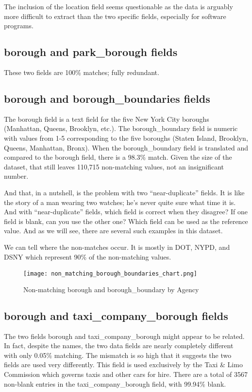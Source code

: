 \documentclass[12pt, titlepage]{article}
\begin{document}
The inclusion of the location field seems questionable as the data is arguably more difficult to extract than the two specific fields, especially for
software programs.

\subsection{borough and park\_borough fields}  These two fields are 100\% matches; fully redundant.

\subsection{borough and borough\_boundaries fields}  The borough field is a text field for the five New York City boroughs (Manhattan, Queens, Brooklyn, etc.).
The borough\_boundary field is numeric with values from 1-5 corresponding to the five boroughs (Staten Island, Brooklyn, Queens, Manhattan, Bronx).
When the borough\_boundary field is translated and compared to the borough field, there is a 98.3\% match. Given the size of the dataset, that 
still leaves 110,715 non-matching values, not an insignificant number.  

And that, in a nutshell, is the problem with two ``near-duplicate'' fields. It is like the  story of a man wearing two watches; he's never
quite sure what time it is. And with ``near-duplicate'' fields, which field is correct when they disagree? 
If one field is blank, can you use the other one? Which field can be used as the reference value.
 And as we will see, there are several such examples in this dataset.

We can tell where the non-matches occur. It is mostly in DOT, NYPD, and DSNY which represent 90\% of the non-matching values.

	\begin{figure}[H]
		 \centering
		 \texttt{[image: non\_matching\_borough\_boundaries\_chart.png]}
		 \caption{Non-matching borough and borough\_boundary by Agency }
		 \label{fig:borough-boundaries}
	\end{figure}	
	
\subsection{borough and taxi\_company\_borough fields}
The two fields borough and taxi\_company\_borough might appear to be related. In fact, despite the names, 
the two data fields are nearly completely different with only 0.05\% matching. The mismatch is so
high that it suggests the two fields are used very differently.  This field is used exclusively by the 
Taxi \& Limo Commission which governs taxis and other cars for hire.
There are a total of 3567 non-blank entries in the taxi\_company\_borough field, with 99.94\% blank.
\end{document}
